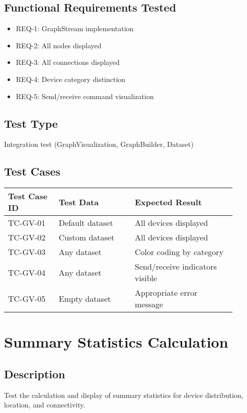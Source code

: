 \documentclass{scrreprt}
\begin{document}
\subsection{Functional Requirements Tested}
\begin{itemize}
    \item REQ-1: GraphStream implementation
    \item REQ-2: All nodes displayed
    \item REQ-3: All connections displayed
    \item REQ-4: Device category distinction
    \item REQ-5: Send/receive command visualization
\end{itemize}

\subsection{Test Type}
Integration test (GraphVisualization, GraphBuilder, Dataset)

\subsection{Test Cases}
\begin{table}[h!]
\centering
\begin{tabular}{|p{0.2\linewidth}|p{0.3\linewidth}|p{0.4\linewidth}|}
    \hline
    Test Case ID & Test Data & Expected Result \\
    \hline
    TC-GV-01 & Default dataset & All devices displayed \\
    \hline
    TC-GV-02 & Custom dataset & All devices displayed \\
    \hline
    TC-GV-03 & Any dataset & Color coding by category \\
    \hline
    TC-GV-04 & Any dataset & Send/receive indicators visible \\
    \hline
    TC-GV-05 & Empty dataset & Appropriate error message \\
    \hline
\end{tabular}
\end{table}

\section{Summary Statistics Calculation}
\subsection{Description}
Test the calculation and display of summary statistics for device distribution, location, and connectivity.
\end{document}
